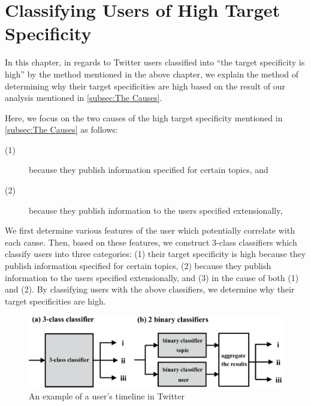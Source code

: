 \section{Classifying Users of High Target Specificity}
\label{sec:ClassificationMethod2}

In this chapter, in regards to Twitter users classified into ``the
target specificity is high'' by the method mentioned in the above
chapter, we explain the method of determining why their target
specificities are high based on the result of our analysis mentioned in
\ref{subsec:The Causes}.

Here, we focus on the two causes of the high target specificity
mentioned in \ref{subsec:The Causes} as follows:
\begin{description}
 \item[(1)] because they publish information specified for certain
            topics, and
 \item[(2)] because they publish information to the users specified
            extensionally,
\end{description}


We first determine various features of the user which potentially
correlate with each cause.  Then, based on these features, we construct
3-class classifiers which classify users into three categories: (1)
their target specificity is high because they publish information
specified for certain topics, (2) because they publish information to
the users specified extensionally, and (3) in the cause of both (1) and
(2).  By classifying users with the above classifiers, we determine why
their target specificities are high.

{\footnotesize
\begin{figure}[t]
\begin{center}
\includegraphics[width=14cm]{images/classifier.eps}
 \caption{An example of a user's timeline in Twitter}
\label{fig:classifier}
\end{center}
\end{figure}
}

